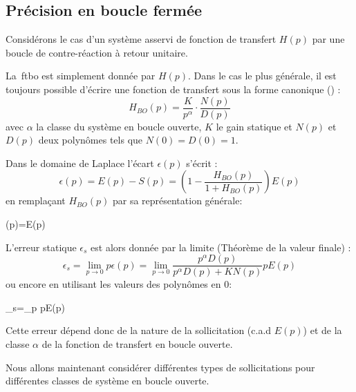 \subsection{Précision en boucle fermée}
Considérons le cas d'un système asservi de fonction de transfert $H(p)$
par une boucle de contre-réaction à retour unitaire.

\begin{center}
\end{center}

La~\gls{ftbo} est simplement donnée par $H(p)$. Dans le cas le plus
générale, il est toujours possible d'écrire une fonction de transfert
sous la forme canonique () :
$$
H_{BO}(p)=\dfrac{K}{p^\alpha}\cdot\dfrac{N(p)}{D(p)}
$$
avec $\alpha$ la classe du système en boucle ouverte, $K$ le gain statique et 
$N(p)$ et $D(p)$ deux polynômes tels que $N(0)=D(0)=1$. 


Dans le domaine de Laplace l'écart $\epsilon(p)$ s'écrit :
$$
\epsilon(p)=E(p)-S(p)=\left(1-\dfrac{H_{BO}(p)}{1+H_{BO}(p)}\right)E(p)
$$
en remplaçant $H_{BO}(p)$ par sa représentation générale:
\begin{bequation}
\epsilon(p)=E(p)
\end{bequation}

L'erreur statique $\epsilon_s$ est alors donnée par la limite (Théorème 
de la valeur finale) :
$$
\epsilon_s=\lim\limits_{p\to 0} p\epsilon(p)=\lim\limits_{p\to 0} \dfrac{p^\alpha D(p)}{p^\alpha D(p)+KN(p)}pE(p) 
$$
ou encore en utilisant les valeurs des polynômes en 0: 
\begin{bequation}
	\epsilon_s=\lim\limits_{p} pE(p)
	\label{eq-erreurStatique}
\end{bequation}

Cette erreur dépend donc de la nature de la sollicitation (c.a.d $E(p)$) et 
de la classe $\alpha$ de la fonction de transfert en boucle ouverte.

Nous allons maintenant considérer différentes types de sollicitations pour différentes
classes de système en boucle ouverte.

